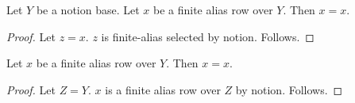 \begin{proposition}\label{notion_finite_alias_offer}
    Let $Y$ be a notion base.
    Let $x$ be a finite alias row over $Y$.
    Then $x=x$.
\end{proposition}
\begin{proof}
    Let $z=x$.
    $z$ is finite-alias selected by notion.
    Follows.
\end{proof}


\begin{proposition}\label{notion_finite_alias_erased_parameter}
    Let $x$ be a finite alias row over $Y$.
    Then $x=x$.
\end{proposition}
\begin{proof}
    Let $Z=Y$.
    $x$ is a finite alias row over $Z$ by notion.
    Follows.
\end{proof}

